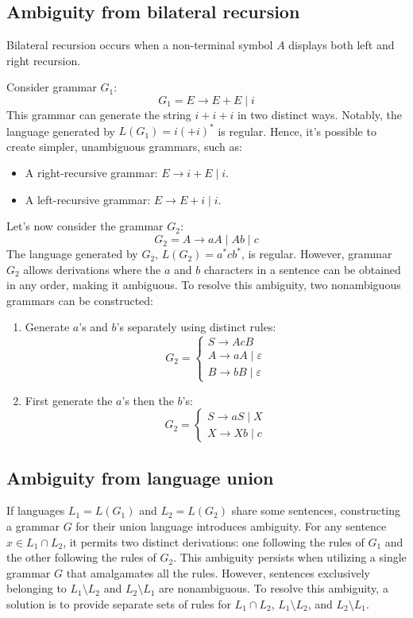 \subsection{Ambiguity from bilateral recursion}
Bilateral recursion occurs when a non-terminal symbol $A$ displays both left and right recursion.
\begin{example}
    Consider grammar $G_1$:
    \[G_1= E \rightarrow E+E\mid i\]
    This grammar can generate the string $i+i+i$ in two distinct ways. 
    Notably, the language generated by $L(G_1)=i(+i)^{\ast}$ is regular.
    Hence, it's possible to create simpler, unambiguous grammars, such as:
    \begin{itemize}
        \item A right-recursive grammar: $E \rightarrow i+E\mid i$.
        \item A left-recursive grammar: $E \rightarrow E+i\mid i$.
    \end{itemize}

    Let's now consider the grammar $G_2$:
    \[G_2= A \rightarrow aA\mid Ab\mid c\]
    The language generated by $G_2$, $L(G_2) = a^{\ast}cb^{\ast}$, is regular. 
    However, grammar $G_2$ allows derivations where the $a$ and $b$ characters in a sentence can be obtained in any order, making it ambiguous.
    To resolve this ambiguity, two nonambiguous grammars can be constructed:
    \begin{enumerate}
        \item Generate $a$'s and $b$'s separately using distinct rules:
            \[G_2=\begin{cases}
                S \rightarrow AcB               \\
                A \rightarrow aA\mid\varepsilon    \\
                B \rightarrow bB\mid\varepsilon 
            \end{cases}\]
        \item First generate the $a$'s then the $b$'s:
            \[G_2=\begin{cases}
                S \rightarrow aS\mid X              \\
                X \rightarrow Xb\mid c   
            \end{cases}\]
    \end{enumerate} 
\end{example}

\subsection{Ambiguity from language union}
If languages $L_1=L(G_1)$ and $L_2=L(G_2)$ share some sentences, constructing a grammar $G$ for their union language introduces ambiguity.
For any sentence $x \in L_1 \cap L_2$, it permits two distinct derivations: one following the rules of $G_1$ and the other following the rules of $G_2$.
This ambiguity persists when utilizing a single grammar $G$ that amalgamates all the rules.
However, sentences exclusively belonging to $L_1 \setminus L_2$ and $L_2 \setminus L_1$ are nonambiguous. 
To resolve this ambiguity, a solution is to provide separate sets of rules for $L_1 \cap L_2$, $L_1 \setminus L_2$, and $L_2 \setminus L_1$.

